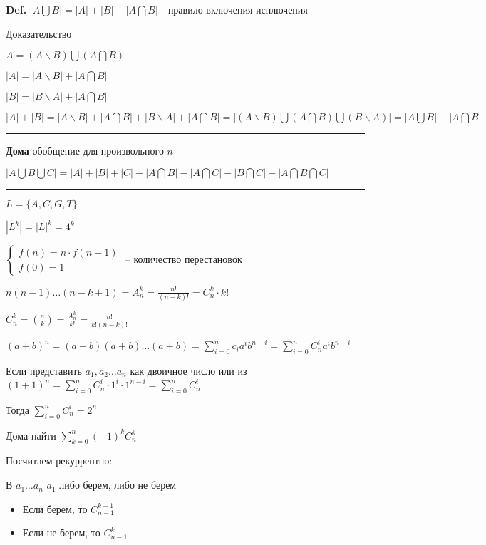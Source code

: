\documentclass[14pt, letter paper]{article}
\begin{document}
\textbf{Def.} $|A \bigcup B| = |A| + |B| - |A \bigcap B|$ - правило включения-исплючения

\begin{center}
    Доказательство
\end{center}

$A = (A \backslash B) \bigcup (A \bigcap B)$

$|A| = |A \backslash B| + |A \bigcap B|$

$|B| = |B \backslash A| + |A \bigcap B|$

$|A| + |B| = |A \backslash B| + |A \bigcap B| + |B \backslash A| + |A \bigcap B| = |(A \backslash B) \bigcup (A \bigcap B) \bigcup (B \backslash A)| = |A \bigcup B| + |A \bigcap B|$

\rule{\paperwidth}{0.4pt}

\textbf{Дома} обобщение для произвольного $n$

$|A \bigcup B \bigcup C| = |A| + |B| + |C| - |A \bigcap B| - |A \bigcap C| - |B \bigcap C| + |A \bigcap B \bigcap C|$

\rule{\paperwidth}{0.4pt}

$L = \{ A, C, G, T\}$

$|L^k| = |L|^k = 4^k$

$\begin{cases}
    f(n) = n \cdot f(n-1) \\ 
    f(0) = 1
\end{cases}$ -- количество перестановок

$n(n-1)\ldots(n-k+1) = A_n^k = \frac{n!}{(n-k)!} = C_n^k \cdot k!$

$C_n^k = {n \choose k} = \frac{A_n^k}{k!} = \frac{n!}{k!(n-k)!}$

$(a + b)^n = (a + b)(a + b) \ldots (a + b) = \sum\limits_{i=0}^n c_i a^i b^{n-i} = \sum\limits_{i=0}^n C_n^i a^i b^{n-i}$

Если представить $a_1, a_2 \ldots a_n$ как двоичное число или из $(1 + 1)^n = \sum\limits_{i=0}^n C_n^i \cdot 1^i \cdot 1^{n-i} = \sum\limits_{i=0}^n C_n^i$

Тогда $\sum\limits_{i=0}^n C_n^i = 2^n$

Дома найти $\sum\limits_{k=0}^n (-1)^k C_n^k$

Посчитаем рекуррентно:

В $a_1 \ldots a_n$ $a_1$ либо берем, либо не берем
\begin{itemize}
    \item Если берем, то $C_{n-1}^{k-1}$
    \item Если не берем, то $C_{n-1}^k$
\end{itemize}
\end{document}
